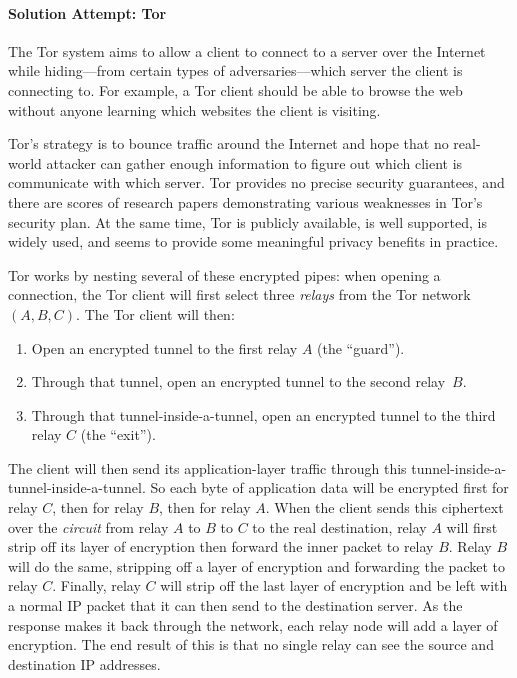 \paragraph{Solution Attempt: Tor}
The Tor system aims to allow a client to connect
to a server over the Internet while hiding---from certain
types of adversaries---which server the client is connecting
to.
For example, a Tor client should be able to browse the web
without anyone learning which websites the client is visiting.

Tor's strategy is to 
bounce traffic around the Internet and hope
that no real-world attacker can gather enough information
to figure out which client is communicate with which server.
Tor provides no precise security guarantees, and there are
scores of research papers demonstrating various weaknesses
in Tor's security plan.
At the same time, Tor is publicly available,
is well supported, is widely used, and 
seems to provide some meaningful privacy benefits in practice.%


Tor works by nesting several of these encrypted pipes: when opening a connection,
the Tor client will first select three \emph{relays} from the Tor network $(A, B, C)$. 
The Tor client will then:
\begin{enumerate}
  \item Open an encrypted tunnel to the first relay $A$ (the ``guard'').
	\item Through that tunnel, open an encrypted tunnel to the second relay~$B$.
	\item Through that tunnel-inside-a-tunnel, open an encrypted tunnel to the
    third relay $C$ (the ``exit'').
\end{enumerate}

The client will then send its application-layer traffic 
through this tunnel-inside-a-tunnel-inside-a-tunnel.
So each byte of application data will be encrypted first for relay
$C$, then for relay $B$, then for relay $A$.
When the client sends this ciphertext over the
\emph{circuit} from relay $A$ to $B$ to $C$ to the
real destination, relay $A$ will first strip off its
layer of encryption then forward the inner packet
to relay $B$. Relay $B$ will do the same, stripping off
a layer of encryption and forwarding the packet to
relay $C$. Finally, relay $C$ will strip off the last layer of
encryption and be left with a normal IP packet
that it can then send to the destination server.
As the response makes it back through the network,
each relay node will add a layer of encryption.
The end result of this is that no single relay
can see the source and destination IP addresses.

